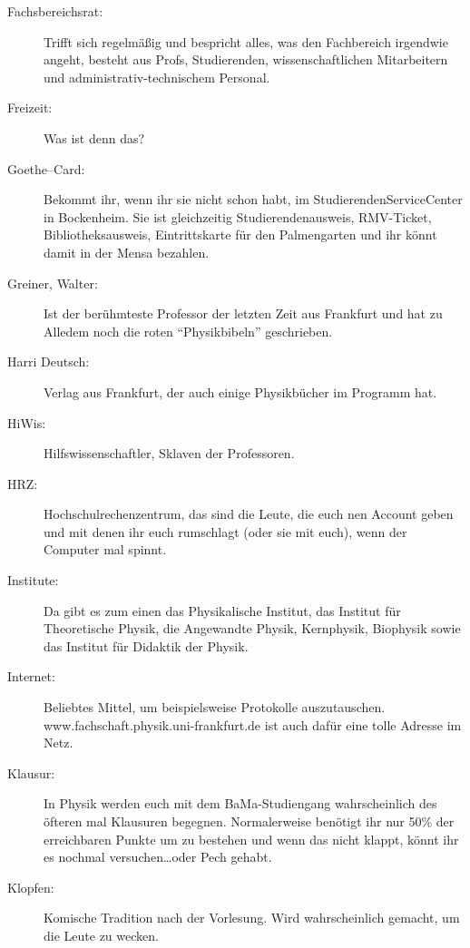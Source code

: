 \begin{description}
    \item[Fachsbereichsrat:] Trifft sich regelmäßig und bespricht
alles, was den Fachbereich irgendwie angeht, besteht aus Profs,
Studierenden, wissenschaftlichen Mitarbeitern und
administrativ-technischem Personal.

    \item[Freizeit:] Was ist denn das?

\item[Goethe--Card:] Bekommt ihr, wenn ihr sie nicht schon habt, im StudierendenServiceCenter in Bockenheim.
Sie ist gleichzeitig Studierendenausweis, RMV-Ticket, Bibliotheksausweis, Eintrittskarte für den Palmengarten und ihr könnt damit in der Mensa bezahlen.

\item[Greiner, Walter:]
Ist der berühmteste Professor der letzten Zeit aus Frankfurt und
hat zu Alledem noch die roten \enquote{Physikbibeln} geschrieben.

    \item[Harri Deutsch:] Verlag aus Frankfurt, der auch einige Physikb\"ucher im Programm hat.

    \item[HiWis:] Hilfswissenschaftler, Sklaven der Professoren.

    \item[HRZ:] Hochschulrechenzentrum, das sind die Leute, die euch nen Account
geben und mit denen ihr euch rumschlagt (oder sie mit euch), wenn
der Computer mal spinnt.

    \item[Institute:] Da gibt es zum einen das
Physikalische Institut, das Institut für Theoretische Physik, die
Angewandte Physik, Kernphysik, Biophysik sowie das Institut für Didaktik der Physik.

    \item[Internet:] Beliebtes
Mittel, um beispielsweise Protokolle auszutauschen.\\
www.fachschaft.physik.uni-frankfurt.de ist auch dafür eine
tolle Adresse im Netz.

    \item[Klausur:] In Physik werden euch mit dem BaMa-Studiengang
wahrscheinlich des öfteren mal Klausuren begegnen.
Normalerweise benötigt ihr nur 50\% der erreichbaren Punkte um zu bestehen und
wenn das nicht klappt, könnt ihr es nochmal versuchen\ldots oder Pech
gehabt.

    \item[Klopfen:] Komische Tradition nach der Vorlesung. Wird
wahrscheinlich gemacht, um die Leute zu wecken.


\end{description}
